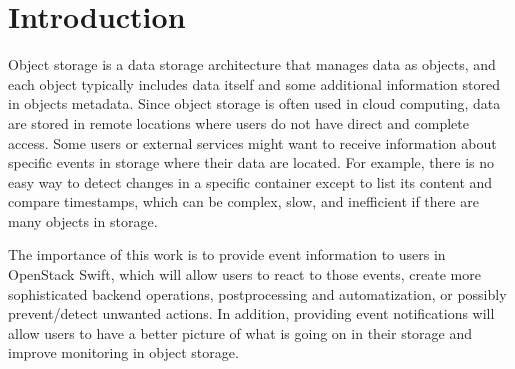 \documentclass{ExcelAtFIT}
\affiliation{*%
  \href{mailto:xvasil03@stud.fit.vutbr.cz}{xvasil03@stud.fit.vutbr.cz},
  \textit{Faculty of Information Technology, Brno University of Technology}}
\begin{document}
\startdocument



\section{Introduction} \label{sec:introduction}




Object storage is a data storage architecture that manages data as objects, and each object typically includes data itself and some additional information stored in objects metadata. Since object storage is often used in cloud computing, data are stored in remote locations where users do not have direct and complete access. Some users or external services might want to receive information about specific events in storage where their data are located. For example, there is no easy way to detect changes in a specific container except to list its content and compare timestamps, which can be complex, slow, and inefficient if there are many objects in storage.

The importance of this work is to provide event information to users in OpenStack Swift, which will allow users to react to those events, create more sophisticated backend operations, postprocessing and automatization, or possibly prevent/detect unwanted actions. In addition, providing event notifications will allow users to have a better picture of what is going on in their storage and improve monitoring in object storage.

\end{document}
